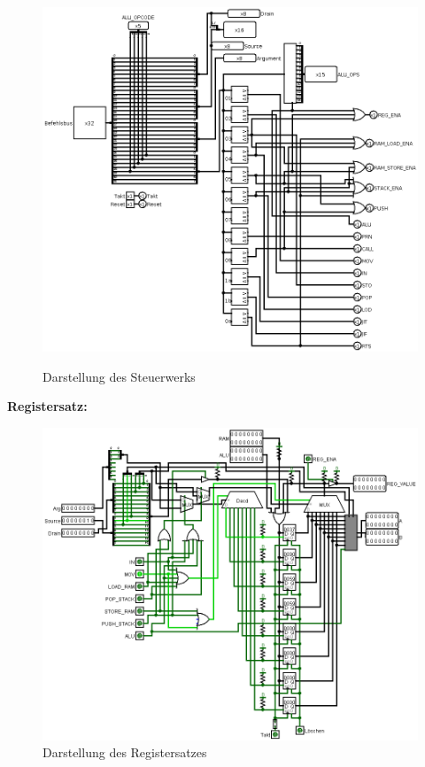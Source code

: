 \documentclass[12pt]{article}
\begin{document}
\begin{figure}[!htb]
\includegraphics[scale=0.40]{cu}
\centering
\label{fig:register}
\caption{Darstellung des Steuerwerks}
\end{figure}

\newpage
\textbf{Registersatz: }
\begin{figure}[!htb]
\includegraphics[scale=0.40]{register}
\caption{Darstellung des Registersatzes}
\centering
\label{fig:register}
\end{figure}
\end{document}
